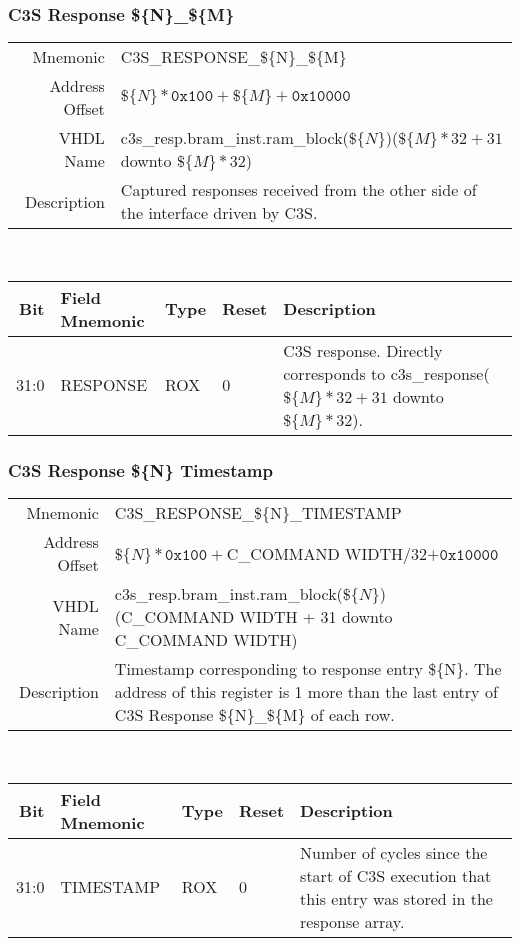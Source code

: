 \subsubsection{C3S Response \$\{N\}\_\$\{M\}}
\begin{tabular}{ r | p{350px} }
  Mnemonic       & C3S\_RESPONSE\_\$\{N\}\_\$\{M\}                                                       \\
  Address Offset & $\$\{N\} * \texttt{0x100} + \$\{M\} + \texttt{0x10000}$                               \\
  VHDL Name      & c3s\_resp.bram\_inst.ram\_block($\$\{N\}$)($\$\{M\} * 32 + 31$ downto $\$\{M\} * 32$) \\ \hline

  Description &
  Captured responses received from the other side of the interface driven by C3S. \\
\end{tabular}
\\
\begin{tabularx}{\textwidth}{r|l|l|l|X}
  \hline
  Bit   & Field Mnemonic & Type & Reset & Description \\ \hline

  31:0  & RESPONSE       & ROX  & 0     &

  C3S response. Directly corresponds to c3s\_response($\$\{M\} * 32 +
  31$ downto $\$\{M\} * 32$). \\
\end{tabularx}

\subsubsection{C3S Response \$\{N\} Timestamp}
\begin{tabular}{ r | p{350px} }
  Mnemonic       & C3S\_RESPONSE\_\$\{N\}\_TIMESTAMP                                                     \\
  Address Offset & $\$\{N\} * \texttt{0x100} + $C\_COMMAND WIDTH/32$ + \texttt{0x10000}$                 \\
  VHDL Name      & c3s\_resp.bram\_inst.ram\_block($\$\{N\}$)(C\_COMMAND WIDTH + 31 downto C\_COMMAND WIDTH) \\ \hline

  Description &
  Timestamp corresponding to response entry \$\{N\}. The address of
  this register is 1 more than the last entry of C3S
  Response \$\{N\}\_\$\{M\} of each row. \\
\end{tabular}
\\
\begin{tabularx}{\textwidth}{r|l|l|l|X}
  \hline
  Bit   & Field Mnemonic & Type & Reset & Description \\ \hline

  31:0  & TIMESTAMP      & ROX  & 0     &

  Number of cycles since the start of C3S execution that this entry
  was stored in the response array. \\
\end{tabularx}

